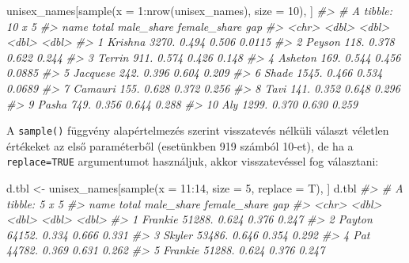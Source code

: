 \documentclass[
]{book}
\newenvironment{Shaded}{\begin{snugshade}}{\end{snugshade}}
\newcommand{\AttributeTok}[1]{\textcolor[rgb]{0.77,0.63,0.00}{#1}}
\newcommand{\CommentTok}[1]{\textcolor[rgb]{0.56,0.35,0.01}{\textit{#1}}}
\newcommand{\DecValTok}[1]{\textcolor[rgb]{0.00,0.00,0.81}{#1}}
\newcommand{\FunctionTok}[1]{\textcolor[rgb]{0.00,0.00,0.00}{#1}}
\newcommand{\NormalTok}[1]{#1}
\newcommand{\OtherTok}[1]{\textcolor[rgb]{0.56,0.35,0.01}{#1}}
\newcommand{\SpecialCharTok}[1]{\textcolor[rgb]{0.00,0.00,0.00}{#1}}
\begin{document}
\begin{Shaded}
\begin{Highlighting}[]
\NormalTok{unisex\_names[}\FunctionTok{sample}\NormalTok{(}\AttributeTok{x =} \DecValTok{1}\SpecialCharTok{:}\FunctionTok{nrow}\NormalTok{(unisex\_names), }\AttributeTok{size =} \DecValTok{10}\NormalTok{), ]}
\CommentTok{\#\textgreater{} \# A tibble: 10 x 5}
\CommentTok{\#\textgreater{}    name     total male\_share female\_share    gap}
\CommentTok{\#\textgreater{}    \textless{}chr\textgreater{}    \textless{}dbl\textgreater{}      \textless{}dbl\textgreater{}        \textless{}dbl\textgreater{}  \textless{}dbl\textgreater{}}
\CommentTok{\#\textgreater{}  1 Krishna  3270.      0.494        0.506 0.0115}
\CommentTok{\#\textgreater{}  2 Peyson    118.      0.378        0.622 0.244 }
\CommentTok{\#\textgreater{}  3 Terrin    911.      0.574        0.426 0.148 }
\CommentTok{\#\textgreater{}  4 Asheton   169.      0.544        0.456 0.0885}
\CommentTok{\#\textgreater{}  5 Jacquese  242.      0.396        0.604 0.209 }
\CommentTok{\#\textgreater{}  6 Shade    1545.      0.466        0.534 0.0689}
\CommentTok{\#\textgreater{}  7 Camauri   155.      0.628        0.372 0.256 }
\CommentTok{\#\textgreater{}  8 Tavi      141.      0.352        0.648 0.296 }
\CommentTok{\#\textgreater{}  9 Pasha     749.      0.356        0.644 0.288 }
\CommentTok{\#\textgreater{} 10 Aly      1299.      0.370        0.630 0.259}
\end{Highlighting}
\end{Shaded}

A \texttt{sample()} függvény alapértelmezés szerint visszatevés nélküli választ véletlen értékeket az első paraméterből (esetünkben 919 számból 10-et), de ha a \texttt{replace=TRUE} argumentumot használjuk, akkor visszatevéssel fog választani:

\begin{Shaded}
\begin{Highlighting}[]
\NormalTok{d.tbl }\OtherTok{\textless{}{-}}\NormalTok{ unisex\_names[}\FunctionTok{sample}\NormalTok{(}\AttributeTok{x =} \DecValTok{11}\SpecialCharTok{:}\DecValTok{14}\NormalTok{, }\AttributeTok{size =} \DecValTok{5}\NormalTok{, }\AttributeTok{replace =}\NormalTok{ T), ]}
\NormalTok{d.tbl}
\CommentTok{\#\textgreater{} \# A tibble: 5 x 5}
\CommentTok{\#\textgreater{}   name     total male\_share female\_share   gap}
\CommentTok{\#\textgreater{}   \textless{}chr\textgreater{}    \textless{}dbl\textgreater{}      \textless{}dbl\textgreater{}        \textless{}dbl\textgreater{} \textless{}dbl\textgreater{}}
\CommentTok{\#\textgreater{} 1 Frankie 51288.      0.624        0.376 0.247}
\CommentTok{\#\textgreater{} 2 Payton  64152.      0.334        0.666 0.331}
\CommentTok{\#\textgreater{} 3 Skyler  53486.      0.646        0.354 0.292}
\CommentTok{\#\textgreater{} 4 Pat     44782.      0.369        0.631 0.262}
\CommentTok{\#\textgreater{} 5 Frankie 51288.      0.624        0.376 0.247}
\end{Highlighting}
\end{Shaded}
\end{document}
